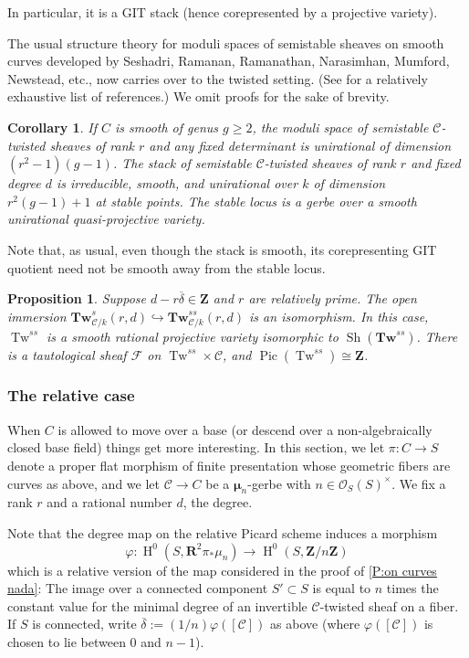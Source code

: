 \documentclass[11pt]{amsart}
\newcommand{\field}[1]{\mathbf #1}
\newcommand{\ms}[1]{\mathscr #1}
\newcommand{\widebar}[1]{\overline{#1}}
\newcommand{\R}{\field R}
\newcommand{\Z}{\field Z}
\renewcommand{\phi}{\varphi}
\DeclareMathOperator{\sh}{Sh}
\DeclareMathOperator{\Pic}{Pic}
\newcommand{\m}{\boldsymbol{\mu}}
\renewcommand{\H}{\operatorname{H}}
\renewcommand{\[}{[\!\hspace{0.03em}[}
\renewcommand{\]}{]\!\hspace{0.03em}]}
\renewcommand{\(}{(\!\hspace{0.03em}(}
\renewcommand{\)}{)\!\hspace{0.03em})}
\newcommand{\inj}{\hookrightarrow}
\newcommand{\Tw}{\mathbf{Tw}}
\DeclareMathOperator{\mTw}{Tw}
\newtheorem{prop}[lem]{Proposition}
\newtheorem{cor}[lem]{Corollary}
\theoremstyle{definition}
\theoremstyle{remark}
\begin{document}
In particular, it is a GIT stack (hence corepresented by a projective 
variety).

The usual structure theory for moduli spaces of semistable sheaves 
on smooth curves developed by Seshadri, Ramanan, Ramanathan, 
Narasimhan, Mumford, Newstead, etc., now carries over to the twisted 
setting.  (See \cite[Appendix 5C]{git} for a relatively exhaustive 
list of references.)  We omit proofs for the sake of brevity.
\begin{cor}\label{C:looks like it should} If $C$ is smooth of genus $g\geq 2$, the moduli space of semistable $\ms C$-twisted sheaves of 
rank $r$ and any fixed determinant is unirational of dimension 
$(r^{2}-1)(g-1)$.  The stack of semistable $\ms C$-twisted sheaves of 
rank $r$ and fixed degree $d$ is irreducible, smooth, and unirational over $k$ of dimension 
$r^{2}(g-1)+1$ at stable points.  The stable locus is a gerbe over a smooth unirational quasi-projective variety.
\end{cor}
Note that, as usual, even though the stack is smooth, its 
corepresenting GIT quotient need not be smooth away from the stable 
locus.

\begin{prop} Suppose $d-r\widebar{\delta}\in\Z$ and $r$ are relatively 
prime.  The open immersion $\Tw^{s}_{\ms C/k}(r,d)\inj\Tw^{ss}_{\ms 
C/k}(r,d)$ is an isomorphism.  In this case, $\mTw^{ss}$ is a smooth 
rational projective variety isomorphic to $\sh(\Tw^{ss})$.  There is 
a tautological sheaf $\ms F$ on $\mTw^{ss}\times\ms C$, and $\Pic(\mTw^{ss})\cong\Z$.
\end{prop}


\subsubsection{The relative case}

When $C$ is allowed to move over a base (or descend over a 
non-algebraically closed base field) things get more 
interesting.  In this section, we let $\pi:C\to S$ denote a proper flat 
morphism of finite presentation whose geometric fibers are curves as 
above, and we let $\ms C\to C$ be a $\m_{n}$-gerbe with 
$n\in{\ms O}_{S}(S)^{\times}$.  We fix a rank $r$ and a rational number $d$, the degree.

Note that the degree map on the relative Picard scheme induces a 
morphism $$\phi:\H^{0}(S,\R^{2}\pi_{\ast}\mu_{n})\to\H^{0}(S,\Z/n\Z)$$ 
which is a relative version of the map considered in the proof of \ref{P:on curves nada}:  
The 
image over a connected component $S'\subset S$ is equal to $n$ times the 
constant value for the minimal degree of an invertible $\ms C$-twisted sheaf on a  
fiber.  If $S$ is connected, write $\widebar{\delta}:=(1/n)\phi([\ms C])$ 
as above (where $\phi([\ms C])$ is chosen to lie between 0 and 
$n-1$).
\end{document}
